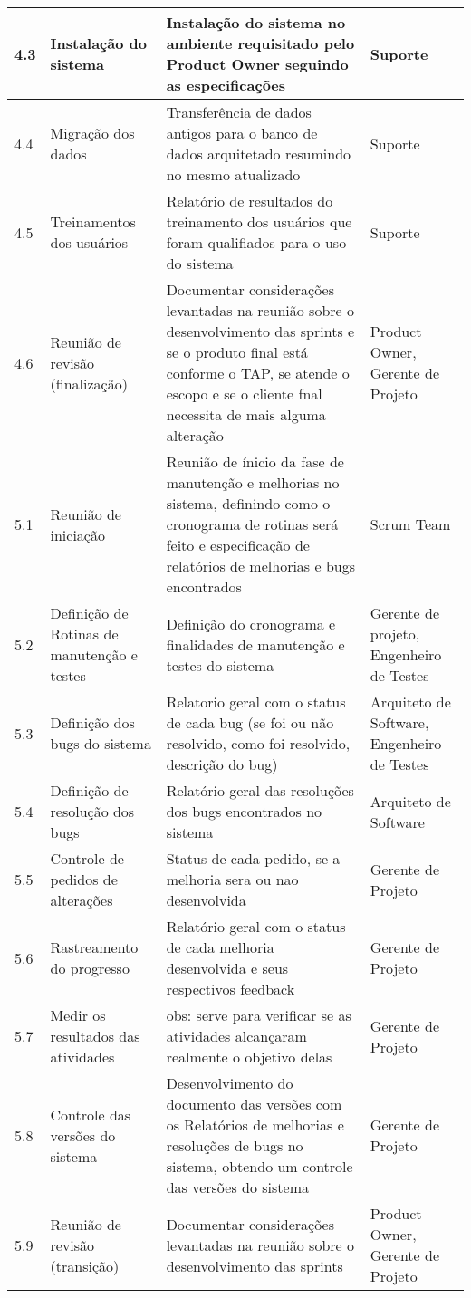 \begin{longtable}[c]{|p{1.89em}|p{7.835em}|p{18.22em}|p{6.835em}|}
    \midrule
    4.3   & Instalação do sistema & Instalação do sistema no ambiente requisitado pelo Product Owner seguindo as especificações & Suporte \\
    \midrule
    4.4   & Migração dos dados & Transferência de dados antigos para o banco de dados arquitetado resumindo no mesmo atualizado & Suporte \\
    \midrule
    4.5   & Treinamentos dos usuários & Relatório de resultados do treinamento dos usuários que foram qualifiados para o uso do sistema & Suporte \\
    \midrule
    4.6   & Reunião de revisão (finalização) & Documentar considerações levantadas na reunião sobre o desenvolvimento das sprints e se o produto final está conforme o TAP, se atende o escopo e se o cliente fnal necessita de mais alguma alteração & Product Owner, Gerente de Projeto \\
    \midrule
    5.1   & Reunião de iniciação & Reunião de ínicio da fase de manutenção e melhorias no sistema, definindo como o cronograma de rotinas será feito e especificação de relatórios de melhorias e bugs encontrados & Scrum Team \\
    \midrule
    5.2   & Definição de Rotinas de manutenção e testes & Definição do cronograma e finalidades de manutenção e testes do sistema & Gerente de projeto, Engenheiro de Testes \\
    \midrule
    5.3   & Definição dos bugs do sistema & Relatorio geral com o status de cada bug (se foi ou não resolvido, como foi resolvido, descrição do bug) & Arquiteto de Software, Engenheiro de Testes \\
    \midrule
    5.4   & Definição de resolução dos bugs & Relatório geral das resoluções dos bugs encontrados no sistema\newline{} & Arquiteto de Software \\
    \midrule
    5.5   & Controle de pedidos de alterações & Status de cada pedido, se a melhoria sera ou nao desenvolvida & Gerente de Projeto \\
    \midrule
    5.6   & Rastreamento do progresso & Relatório geral com o status de cada melhoria desenvolvida e seus respectivos feedback & Gerente de Projeto \\
    \midrule
    5.7   & Medir os resultados das atividades & obs: serve para verificar se as atividades alcançaram realmente o objetivo delas & Gerente de Projeto \\
    \midrule
    5.8   & Controle das versões do sistema & Desenvolvimento do documento das versões com os Relatórios de melhorias e resoluções de bugs no sistema, obtendo um controle das versões do sistema & Gerente de Projeto \\
    \midrule
    5.9   & Reunião de revisão (transição) & Documentar considerações levantadas na reunião sobre o desenvolvimento das sprints & Product Owner, Gerente de Projeto \\
    \bottomrule
\end{longtable}